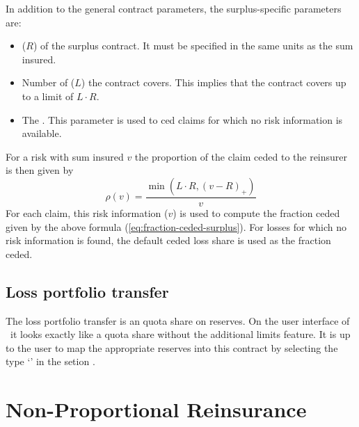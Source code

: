 In addition to the general contract parameters, the surplus-specific parameters are:
\begin{itemize}
	\item {} ($R$) of the surplus contract. It must be specified in the same units as the sum insured.
	\item Number of  ($L$) the contract covers. This implies that the contract covers up to a limit of $L \cdot R$.
	\item The . This parameter is used to ced  claims for which no risk information is available.
\end{itemize}

For a risk with sum insured $v$ the proportion of the claim ceded to the reinsurer is then given by
\begin{equation}
\rho(v) = \frac{\min(L \cdot R, (v - R)_{+})}{v}
\label{eq:fraction-ceded-surplus}
\end{equation}
For each claim, this risk information ($v$) is used to compute the fraction ceded given by the above formula (\ref{eq:fraction-ceded-surplus}). For losses for which no risk information is found, the default ceded loss share is used as the fraction ceded.



\subsection{Loss portfolio transfer}
\label{subsec:LPT}

The loss portfolio transfer is an quota share on reserves.
On the user interface of \RA\ it looks exactly like a quota share without the additional limits feature. It is up to the user to map the appropriate reserves into this contract by selecting the type `' in the setion .





\section{Non-Proportional Reinsurance}
\label{sec:NonProportionalReinsurance}


